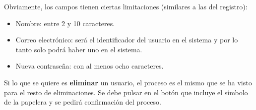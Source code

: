 Obviamente, los campos tienen ciertas limitaciones (similares a las del
registro):
\begin{itemize}
    \item Nombre: entre 2 y 10 caracteres.
    \item Correo electrónico: será el identificador del usuario en el sistema y
    por lo tanto solo podrá haber uno en el sistema.
    \item Nueva contraseña: con al menos ocho caracteres.
\end{itemize}

Si lo que se quiere es \textbf{eliminar} un usuario, el proceso es el mismo que
se ha visto para el resto de eliminaciones. Se debe pulsar en el botón que
incluye el símbolo de la papelera y se pedirá confirmación del proceso.

